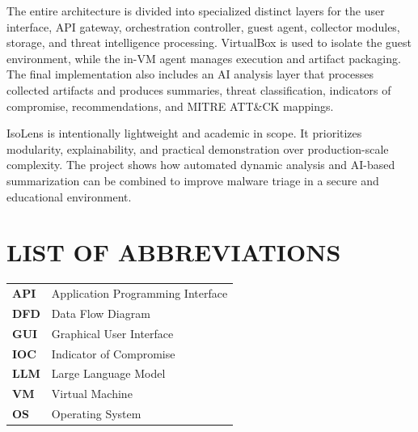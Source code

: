 \documentclass[a4paper,12pt,oneside]{report}
\begin{document}
\par

\par

The entire architecture is divided into specialized distinct layers for the user interface, API gateway, orchestration controller, guest agent, collector modules, storage, and threat intelligence processing. VirtualBox is used to isolate the guest environment, while the in-VM agent manages execution and artifact packaging. The final implementation also includes an AI analysis layer that processes collected artifacts and produces summaries, threat classification, indicators of compromise, recommendations, and MITRE ATT\&CK mappings.

\par

\par

IsoLens is intentionally lightweight and academic in scope. It prioritizes modularity, explainability, and practical demonstration over production-scale complexity. The project shows how automated dynamic analysis and AI-based summarization can be combined to improve malware triage in a secure and educational environment.

\newpage
\tableofcontents

\newpage
\listoffigures
{}

\newpage
\listoftables
{}

\newpage
\chapter*{\uppercase{List of Abbreviations}}
\begin{table}[H]
\renewcommand{\arraystretch}{1.5}
\begin{tabularx}{\textwidth}{>{\bfseries}l X}
API & Application Programming Interface \\
DFD & Data Flow Diagram \\
GUI & Graphical User Interface \\
IOC & Indicator of Compromise \\
LLM & Large Language Model \\
VM & Virtual Machine \\
OS & Operating System \\
\end{tabularx}
\end{table}
\end{document}

